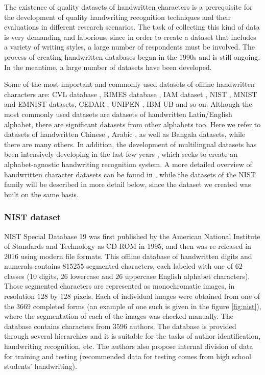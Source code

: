 \documentclass[eng]{simposium}
\begin{document}
The existence of quality datasets of handwritten characters is a prerequisite for the development of quality handwriting 
recognition techniques and their evaluations in different research scenarios. 
The task of collecting this kind of data is very demanding and laborious, since in order to create a dataset that includes 
a variety of writing styles, a large number of respondents must be involved. 
The process of creating handwritten databases began in the 1990s\cite{9} and is still ongoing. 
In the meantime, a large number of datasets have been developed. 

Some of the most important and commonly used datasets of offline handwritten characters are: CVL database \cite{18}, RIMES database \cite{10},
IAM dataset \cite{11}, 
NIST \cite{12}\cite{13}, MNIST \cite{8} and EMNIST \cite{1} datasets, CEDAR \cite{14}, UNIPEN \cite{15}, IBM UB \cite{16} and so on. 
Although the most commonly used datasets are datasets of handwritten Latin/English alphabet, 
there are significant datasets from other alphabets too. 
Here we refer to datasets of handwritten Chinese \cite{19, 20, 21}, Arabic \cite{22, 23}, as well as Bangala \cite{24, 25} datasets,
while there are many others. 
In addition, the development of multilingual datasets has been intensively developing in the last few years \cite{17, 26, 18},
which seeks to create an alphabet-agnostic handwriting recognition system. 
A more detailed overview of handwritten character datasets can be found in \cite{9}, 
while the datasets of the NIST family will be described in more detail below, since the dataset we created was built on the same basis. 

\subsubsection{NIST dataset}

NIST Special Database 19 \cite{12, 13} was first published by the American National Institute of Standards and Technology as CD-ROM in 1995, and then was 
re-released in 2016 using modern file formats. 
This offline database of handwritten digits and numerals contains $815255$ segmented characters, each labeled 
with one of $62$ classes ($10$ digits, $26$ lowercase and $26$ uppercase English alphabet characters). 
Those segmented characters are represented as monochromatic images, in resolution $128$ by $128$ pixels. 
Each of individual images were obtained from one of the $3669$ completed forms (an example of one such is given in the figure \ref{fig:nist}), 
where the segmentation of each of the images was checked manually. 
The database contains characters from $3596$ authors. 
The database is provided through several hierarchies and it is suitable for the tasks of author identification, handwriting recognition, etc. 
The authors also propose internal division of data for training and testing 
(recommended data for testing comes from high school students' handwriting). 
\end{document}
